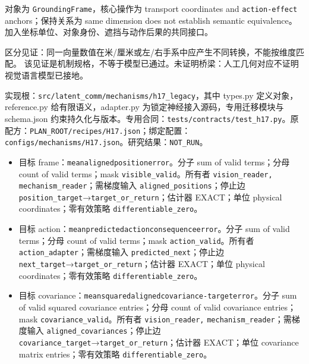 \documentclass[
  10pt,
]{article}
\begin{document}
对象为 \nolinkurl{GroundingFrame}，核心操作为 transport coordinates and
\nolinkurl{action-effect} anchors；保持关系为 same dimension does not
establish semantic
equivalence。加入坐标单位、对象身份、遮挡与动作后果的共同接口。

区分见证：同一向量数值在米/厘米或左/右手系中应产生不同转换，不能按维度匹配。
该见证是机制规格，不等于模型已通过。未证明桥梁：人工几何对应不证明视觉语言模型已接地。

实现根：{\small\nolinkurl{src/latent_comm/mechanisms/h17_legacy}}，其中
types.py 定义对象，reference.py 给有限语义，adapter.py
为锁定神经接入源码，专用迁移模块与 schema.json
约束持久化与版本。专用合同：{\small\nolinkurl{tests/contracts/test_h17.py}}。原配方：{\small\nolinkurl{PLAN_ROOT/recipes/H17.json}}；绑定配置：{\small\nolinkurl{configs/mechanisms/H17.json}}。研究结果：\nolinkurl{NOT_RUN}。

\begin{itemize}
\item
  目标
  frame：{\small\nolinkurl{mean}\hspace{0.333em}\nolinkurl{aligned}\hspace{0.333em}\nolinkurl{position}\hspace{0.333em}\nolinkurl{error}}。分子
  sum of valid terms；分母 count of valid terms；mask
  \nolinkurl{visible_valid}。所有者 \nolinkurl{vision_reader,}
  \nolinkurl{mechanism_reader}；需梯度输入
  \nolinkurl{aligned_positions}；停止边
  \nolinkurl{position_target}→\nolinkurl{target_or_return}；估计器
  EXACT；单位 physical coordinates；零有效策略
  \nolinkurl{differentiable_zero}。
\item
  目标
  action：{\small\nolinkurl{mean}\hspace{0.333em}\nolinkurl{predicted}\hspace{0.333em}\nolinkurl{action}\hspace{0.333em}\nolinkurl{consequence}\hspace{0.333em}\nolinkurl{error}}。分子
  sum of valid terms；分母 count of valid terms；mask
  \nolinkurl{action_valid}。所有者
  \nolinkurl{action_adapter}；需梯度输入
  \nolinkurl{predicted_next}；停止边
  \nolinkurl{next_target}→\nolinkurl{target_or_return}；估计器
  EXACT；单位 physical coordinates；零有效策略
  \nolinkurl{differentiable_zero}。
\item
  目标
  covariance：{\small\nolinkurl{mean}\hspace{0.333em}\nolinkurl{squared}\hspace{0.333em}\nolinkurl{aligned}\hspace{0.333em}\nolinkurl{covariance-target}\hspace{0.333em}\nolinkurl{error}}。分子
  sum of valid squared covariance entries；分母 count of valid
  covariance entries；mask \nolinkurl{covariance_valid}。所有者
  \nolinkurl{vision_reader,} \nolinkurl{mechanism_reader}；需梯度输入
  \nolinkurl{aligned_covariances}；停止边
  \nolinkurl{covariance_target}→\nolinkurl{target_or_return}；估计器
  EXACT；单位 covariance matrix entries；零有效策略
  \nolinkurl{differentiable_zero}。
\end{itemize}
\end{document}

